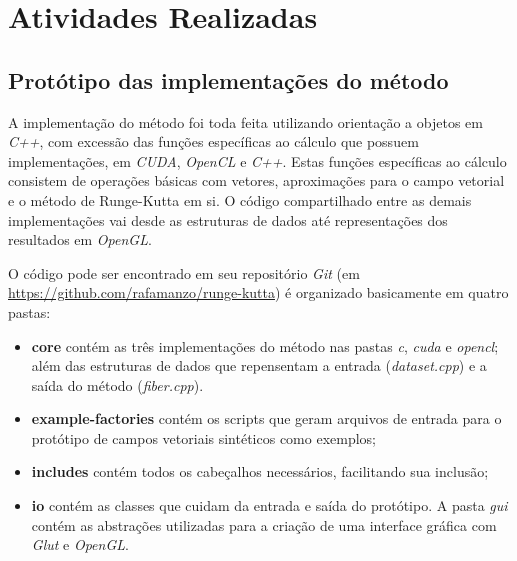 \chapter{Atividades Realizadas}

\section{Protótipo das implementações do método}
\label{primeiroprototipo}
A implementação do método foi toda feita utilizando orientação a objetos em \textit{C++}, com excessão das funções específicas ao cálculo que possuem implementações, em \textit{CUDA}, \textit{OpenCL} e \textit{C++}. Estas funções específicas ao cálculo consistem de operações básicas com vetores, aproximações para o campo vetorial e o método de Runge-Kutta em si. O código compartilhado entre as demais implementações vai desde as estruturas de dados até representações dos resultados em \textit{OpenGL}.

O código pode ser encontrado em seu repositório \textit{Git} \newline(em \href{https://github.com/rafamanzo/runge-kutta}{https://github.com/rafamanzo/runge-kutta}) é organizado basicamente em quatro pastas:
\begin{itemize}
  \item \textbf{core} contém as três implementações do método nas pastas \textit{c}, \textit{cuda} e \textit{opencl}; além das estruturas de dados que repensentam a entrada (\textit{dataset.cpp}) e a saída do método (\textit{fiber.cpp}).
  \item \textbf{example-factories} contém os scripts que geram arquivos de entrada para o protótipo de campos vetoriais sintéticos como exemplos;
  \item \textbf{includes} contém todos os cabeçalhos necessários, facilitando sua inclusão;
  \item \textbf{io} contém as classes que cuidam da entrada e saída do protótipo. A pasta \textit{gui} contém as abstrações utilizadas para a criação de uma interface gráfica com \textit{Glut} e \textit{OpenGL}.
\end{itemize}

